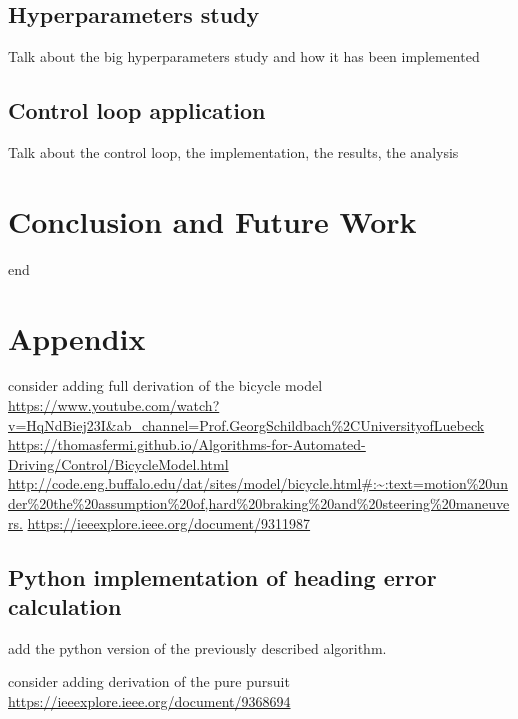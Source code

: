 \documentclass[a4paper,12pt,sort&compress]{article}
\begin{document}
\subsection{Hyperparameters study}
    Talk about the big hyperparameters study and how it has been implemented

\subsection{Control loop application}
    Talk about the control loop, the implementation, the results, the analysis





\newpage
\section{Conclusion and Future Work}
end




\newpage
\section{Appendix}
consider adding full derivation of the bicycle model \url{https://www.youtube.com/watch?v=HqNdBiej23I&ab_channel=Prof.GeorgSchildbach%2CUniversityofLuebeck}
\url{https://thomasfermi.github.io/Algorithms-for-Automated-Driving/Control/BicycleModel.html}
\url{http://code.eng.buffalo.edu/dat/sites/model/bicycle.html#:~:text=motion%20under%20the%20assumption%20of,hard%20braking%20and%20steering%20maneuvers.}
\url{https://ieeexplore.ieee.org/document/9311987}

\subsection{Python implementation of heading error calculation}
add the python version of the previously described algorithm.

consider adding derivation of the pure pursuit
\url{https://ieeexplore.ieee.org/document/9368694}


\newpage
\end{document}
